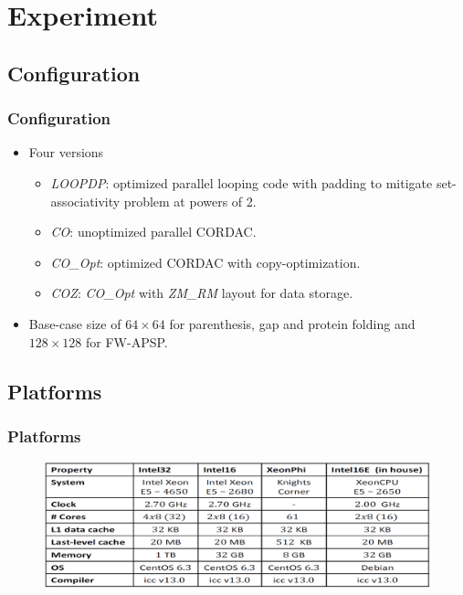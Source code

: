 \section{Experiment}

\subsection{Configuration}
\begin{frame}
    \frametitle{Configuration}
    \begin{itemize}
    	\item Four versions
		    \begin{itemize}
				\item \textit{LOOPDP}: optimized parallel looping code with padding
					to mitigate set-associativity problem at powers of 2.
				\item \textit{CO}: unoptimized parallel CORDAC.
				\item \textit{CO\_Opt}: optimized CORDAC with copy-optimization.
				\item \textit{COZ}: \textit{CO\_Opt} with \textit{ZM\_RM} 
					layout for data storage.
			\end{itemize}
		\item Base-case size of $64 \times 64$ for parenthesis, gap and protein 
			folding and $128 \times 128$ for FW-APSP.
	\end{itemize}
\end{frame}

\subsection{Platforms}
\begin{frame}
    \frametitle{Platforms}
    \begin{figure}
		\includegraphics[scale=0.3]{figure/fig-platforms.png}
	\end{figure}
\end{frame}

